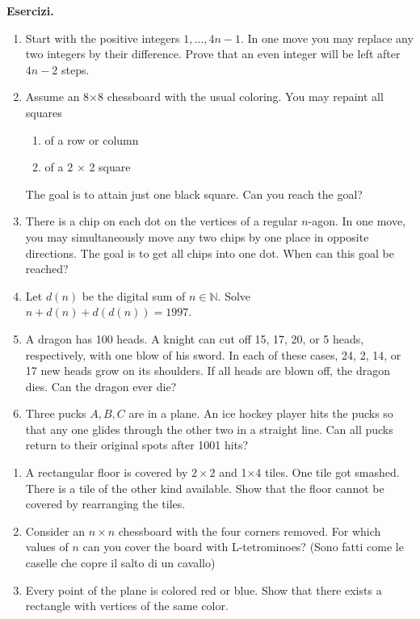 \documentclass[a4paper]{article}
\theoremstyle{remark}
\theoremstyle{definition}
\newcommand{\subscript}[2]{$#1  #2$}
\begin{document}
\textbf{Esercizi.}
\begin{enumerate}[label=(\subscript{a}{\arabic*})]
	\item Start with the positive integers $ 1,\dots, 4n - 1 $. In one move you may replace any two integers by their difference. Prove that an even integer will be left after $ 4n - 2 $ steps.
	
	\item  Assume an 8$ \times $8 chessboard with the usual coloring. You may repaint all squares
	\begin{enumerate}
		\item of a row or column
		\item  of a 2 $ \times $ 2 square
	\end{enumerate}
	The goal is to attain just one black square.
	Can you reach the goal?
	
	\item There is a chip on each dot on the vertices of a regular $ n $-agon. In one move, you may simultaneously move any two chips by one place in opposite directions. The goal is to get all chips into one dot. When can this goal be reached?
	
	\item  Let $ d(n) $ be the digital sum of $ n \in \mathbb{N} $. Solve $ n + d(n) + d(d(n)) = 1997 $.
	
	\item   A dragon has 100 heads. A knight can cut off 15, 17, 20, or 5 heads, respectively,
	with one blow of his sword. In each of these cases, 24, 2, 14, or 17 new heads grow
	on its shoulders. If all heads are blown off, the dragon dies. Can the dragon ever die?
	
	\item  Three pucks $ A, B, C $ are in a plane. An ice hockey player hits the pucks so that
	any one glides through the other two in a straight line. Can all pucks return to their
	original spots after 1001 hits?
	
\end{enumerate}
\begin{enumerate}[label=(\subscript{b}{\arabic*})]
	\item A rectangular floor is covered by $ 2\times 2 $ and 1$ \times $4 tiles. One tile got smashed. There is a tile of the other kind available. Show that the floor cannot be covered by rearranging
	the tiles.
	
	\item Consider an $ n \times n $ chessboard with the four corners removed. For which values of $ n $
	can you cover the board with L-tetrominoes? (Sono fatti come le caselle che copre il salto di un cavallo)
	
	\item Every point of the plane is colored red or blue. Show that there exists a rectangle
	with vertices of the same color.
	
	
\end{enumerate}
\end{document}
